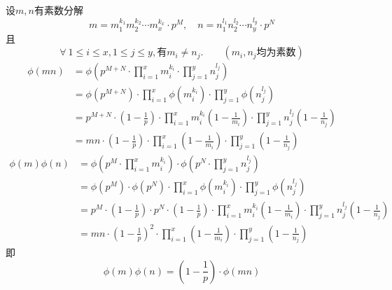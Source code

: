 \documentclass[UTF8]{ctexart}
\begin{document}
\subsection{}   %
设$m,n$有素数分解
\[
    m = m_1^{k_1} m_2^{k_2} \cdots m_x^{k_x} \cdot p^{M},
    \quad
    n = n_1^{l_1} n_2^{l_2} \cdots n_y^{l_y} \cdot p^{N}
\]
且
\[
    \forall\ 1\leq i \leq x, 1\leq j \leq y,
    \mbox{有}
    m_i \neq n_j.
    \qquad
    (m_i,n_j\mbox{均为素数})
\]
\begin{align*}
    \phi (mn) 
    & = 
    \phi \left( p^{M+N}
    \cdot \prod\limits_{i=1}^{x} m_i^{k_i} 
    \cdot \prod\limits_{j=1}^{y} n_{j}^{l_{j}} \right)\\
    & = 
    \phi (p^{M+N}) 
    \cdot \prod\limits_{i=1}^{x} \phi (m_i^{k_i}) 
    \cdot \prod\limits_{j=1}^{y} \phi (n_{j}^{l_{j}})\\
    & = 
    p^{M+N}\cdot \displaystyle{(1-\frac{1}{p})}
    \cdot \prod\limits_{i=1}^{x} m_i^{k_i} \displaystyle{(1-\frac{1}{m_i})}
    \cdot \prod\limits_{j=1}^{y} n_{j}^{l_{j}} \displaystyle{(1-\frac{1}{n_j})}\\
    & =
    mn \cdot \displaystyle{(1-\frac{1}{p})}
    \cdot \prod\limits_{i=1}^{x} \displaystyle{(1-\frac{1}{m_i})}
    \cdot \prod\limits_{j=1}^{y} \displaystyle{(1-\frac{1}{n_j})}
\end{align*}
\begin{align*}
    \phi (m) \phi(n) 
    & = 
    \phi \left( p^{M}
        \cdot \prod\limits_{i=1}^{x} m_i^{k_i} 
    \right)
    \cdot
    \phi \left( p^{N}
        \cdot \prod\limits_{j=1}^{y} n_{j}^{l_{j}}
    \right)
    \\
    & = 
    \phi (p^{M}) \cdot \phi (p^{N})
    \cdot \prod\limits_{i=1}^{x} \phi (m_i^{k_i}) 
    \cdot \prod\limits_{j=1}^{y} \phi (n_{j}^{l_{j}})\\
    & = 
    p^{M}\cdot \displaystyle{(1-\frac{1}{p})}
    \cdot p^{N}\cdot \displaystyle{(1-\frac{1}{p})}
    \cdot \prod\limits_{i=1}^{x} m_i^{k_i} \displaystyle{(1-\frac{1}{m_i})}
    \cdot \prod\limits_{j=1}^{y} n_{j}^{l_{j}} \displaystyle{(1-\frac{1}{n_j})}\\
    & =
    mn \cdot \displaystyle{{(1-\frac{1}{p})}^2}
    \cdot \prod\limits_{i=1}^{x} \displaystyle{(1-\frac{1}{m_i})}
    \cdot \prod\limits_{j=1}^{y} \displaystyle{(1-\frac{1}{n_j})}
\end{align*}
即
\[
    \phi (m) \phi(n) = \displaystyle{(1-\frac{1}{p})} \cdot \phi (mn)
\]
\end{document}
